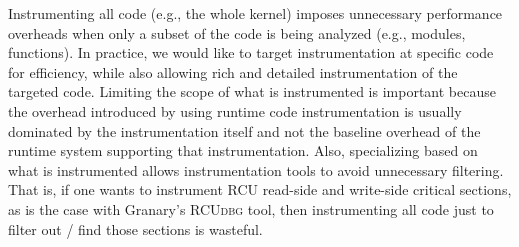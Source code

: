 \documentclass[preprint]{sigplanconf}
\newcommand{\toolname}[1]{{\scshape #1}}
\begin{document}


Instrumenting all code (e.g., the whole kernel) imposes unnecessary performance overheads when only a subset of the code is being analyzed (e.g., modules, functions). In practice, we would like to target instrumentation at specific code for efficiency, while also allowing rich and detailed instrumentation of the targeted code. Limiting the scope of what is instrumented is  important because the overhead introduced by using runtime code instrumentation is usually dominated by the instrumentation itself and not the baseline overhead of the runtime system supporting that instrumentation. Also, specializing based on what is instrumented allows instrumentation tools to avoid unnecessary filtering. That is, if one wants to instrument RCU read-side and write-side critical sections, as is the case with Granary's \toolname{RCUdbg} tool, then instrumenting all code just to filter out / find those sections is wasteful.
\end{document}
